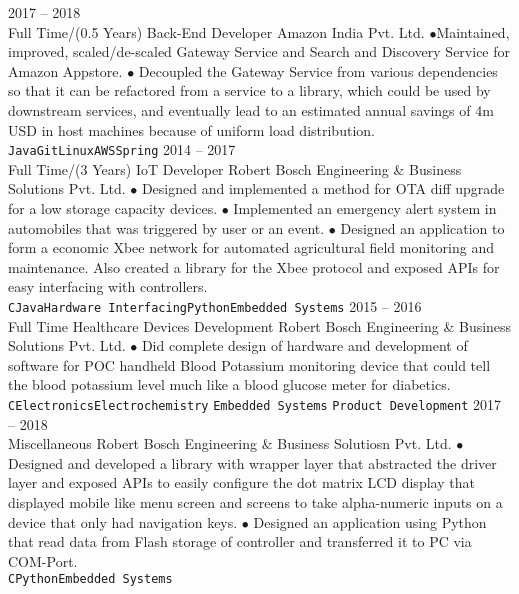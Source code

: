 \documentclass[9pt]{developercv} %
\begin{document}
\begin{entrylist}
	\entry
		{2017 -- 2018\\\footnotesize{Full Time/(0.5 Years)}}
		{Back-End Developer}
		{Amazon India Pvt. Ltd.}
		{$\bullet$Maintained,  improved, scaled/de-scaled  Gateway Service and Search and Discovery Service for Amazon Appstore. $\bullet$ Decoupled the Gateway Service from various dependencies so that it can be refactored from a service to a library, which could be used by downstream services, and eventually lead to an estimated annual savings of 4m USD in host machines because of uniform load distribution.\\ \texttt{Java}\slashsep\texttt{Git}\slashsep\texttt{Linux}\slashsep\texttt{AWS}\slashsep\texttt{Spring}}
	\entry
		{2014 -- 2017\\\footnotesize{Full Time/(3 Years)}}
		{IoT Developer}
		{Robert Bosch Engineering \& Business Solutions Pvt. Ltd.}
		{ $\bullet$ Designed and implemented a method for OTA diff upgrade for a low storage capacity devices. $\bullet$ Implemented an emergency alert system in automobiles that was triggered by user or an event. $\bullet$  Designed an application to form a economic Xbee network for automated agricultural field monitoring and maintenance. Also created a library for the Xbee protocol and exposed APIs for easy interfacing with controllers. \\ \texttt{C}\slashsep\texttt{Java}\slashsep\texttt{Hardware Interfacing}\slashsep\texttt{Python}\slashsep\texttt{Embedded Systems}}
	\entry
		{2015 -- 2016\\\footnotesize{Full Time}}
		{Healthcare Devices Development}
		{Robert Bosch Engineering  \& Business Solutions  Pvt. Ltd.}
		{$\bullet$ Did complete design of hardware and development of software for POC handheld Blood Potassium monitoring device that could tell the blood potassium level much like a blood glucose meter for diabetics. \\ \texttt{C}\slashsep\texttt{Electronics}\slashsep\texttt{Electrochemistry} \slashsep\texttt{Embedded Systems} \slashsep\texttt{Product Development}}
\entry
		{2017 -- 2018\\\footnotesize{}}
		{Miscellaneous}
		{Robert Bosch Engineering  \& Business Solutiosn  Pvt. Ltd.}
		{$\bullet$ Designed and developed a library with wrapper layer that abstracted  the driver layer and exposed APIs to easily configure the dot matrix LCD display that displayed mobile like menu screen and screens to take alpha-numeric inputs on a device that only had navigation keys. $\bullet$ Designed an application using Python that read data from Flash storage of controller and transferred it to PC via COM-Port. \\ \texttt{C}\slashsep\texttt{Python}\slashsep\texttt{Embedded Systems}}
\end{entrylist}
\end{document}
